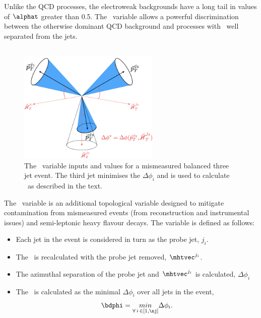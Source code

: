 Unlike the QCD processes, the electroweak backgrounds have a long tail in
values of $\alphat$ greater than 0.5. The \alphat~variable allows a powerful discrimination 
between the otherwise dominant QCD background and processes with \met~well
separated from the jets.

\subsection{\bdphi}
\begin{figure}
\centering
    \includegraphics[width=0.6\textwidth]{./Figures/alphat/bdphi_cartoon}
  \caption{\label{fig:bdphi_cartoon} The \bdphi~variable inputs and values for a mismeasured balanced three jet event.
  The third jet minimises the $\Delta \phi_i$ and is used to calculate \bdphi~as described in the text.}
\end{figure}
The \bdphi~variable is an additional topological variable designed to mitigate contamination
from mismeasured events (from reconstruction and instrumental issues) and semi-leptonic 
heavy flavour decays. The variable is defined as follows:
\begin{itemize}
\item Each jet in the event is considered in turn as the probe jet, $j_i$.
\item The \mhtvec~is recalculated with the probe jet removed, $\mhtvec^{j_i}$.
\item The azimuthal separation of the probe jet and $\mhtvec^{j_i}$ is calculated, $\Delta \phi_i$
\item The \bdphi~is calculated as the minimal $\Delta \phi_i$ over all jets in the event,
\begin{equation}
\label{equ:bdphi}
\bdphi = \underset{\forall\, i\, \in \left[1,\nj\right]}{min} \Delta \phi_i.
\end{equation}
\end{itemize}


